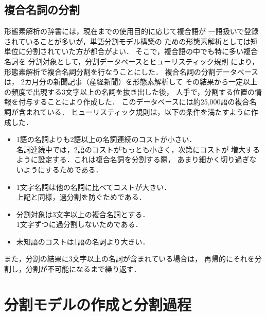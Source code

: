 \subsection{複合名詞の分割}
形態素解析の辞書には，現在までの使用目的に応じて複合語が
一語扱いで登録されていることが多いが，単語分割モデル構築の
ための形態素解析としては短単位に分割されていた方が都合がよい．
そこで，複合語の中でも特に多い複合名詞を
分割対象として，分割データベースとヒューリスティック規則
により，形態素解析で複合名詞分割を行なうことにした．
複合名詞の分割データベースは，
2カ月分の新聞記事（産経新聞）を形態素解析して
\mbox{その結果から一定以上}の頻度で出現する3文字以上の名詞を抜き出した後，
人手で，分割する位置の情報を付与することにより作成した．
このデータベースには約25,000語の複合名詞が含まれている．
ヒューリスティック規則は，以下の条件を満たすように作成した．
\begin{itemize}
\item 1語の名詞よりも2語以上の名詞連続のコストが小さい．\\
名詞連続中では，2語のコストがもっとも小さく，次第にコストが
\mbox{増大するように設定す}る．これは複合名詞を分割する際，
あまり細かく切り過ぎないようにするためである．
\item 1文字名詞は他の名詞に比べてコストが大きい． \\
上記と同様，過分割を防ぐためである．
\item 分割対象は3文字以上の複合名詞とする． \\
1文字ずつに過分割しないためである．
\item 未知語のコストは1語の名詞より大きい． 
\end{itemize}
\vspace*{3mm}
また，分割の結果に3文字以上の名詞が含まれている場合は，
再帰的にそれを分割し，分割が不可能になるまで繰り返す．
\section{分割モデルの作成と分割過程}
\vspace{-1mm}
